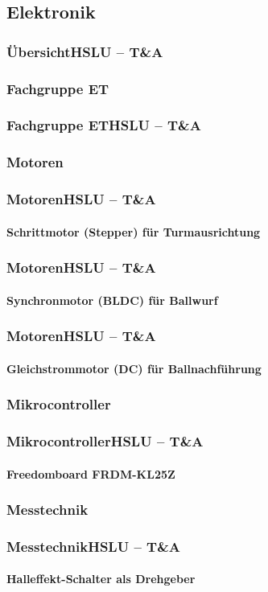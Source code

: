 \subsection{Elektronik}

\author{Ervin Mazlagi\'c}

\begin{frame}
	\frametitle{Übersicht\hfill{}\footnotesize HSLU -- T\&A}
\end{frame}

\subsubsection{Fachgruppe ET}
\begin{frame}
	\frametitle{Fachgruppe ET\hfill{}\footnotesize HSLU -- T\&A}
\end{frame}

\subsubsection{Motoren}
\begin{frame}
	\frametitle{Motoren\hfill{}\footnotesize HSLU -- T\&A}
	\framesubtitle{Schrittmotor (Stepper) für Turmausrichtung}
\end{frame}

\begin{frame}
	\frametitle{Motoren\hfill{}\footnotesize HSLU -- T\&A}
	\framesubtitle{Synchronmotor (BLDC) für Ballwurf}
\end{frame}

\begin{frame}
	\frametitle{Motoren\hfill{}\footnotesize HSLU -- T\&A}
	\framesubtitle{Gleichstrommotor (DC) für Ballnachführung}
\end{frame}

\subsubsection{Mikrocontroller}
\begin{frame}
	\frametitle{Mikrocontroller\hfill{}\footnotesize HSLU -- T\&A}
	\framesubtitle{Freedomboard FRDM-KL25Z}
\end{frame}

\subsubsection{Messtechnik}
\begin{frame}
	\frametitle{Messtechnik\hfill{}\footnotesize HSLU -- T\&A}
	\framesubtitle{Halleffekt-Schalter als Drehgeber}
\end{frame}
